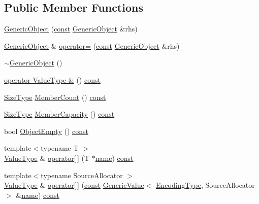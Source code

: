 \subsection*{Public Member Functions}
\begin{DoxyCompactItemize}
\item 
\hyperlink{classGenericObject_a10173c42d0e8a71ca0e3ae75d800887a}{Generic\+Object} (\hyperlink{classGenericObject_af70c9646b5e422306c33e98b3d8783a7}{const} \hyperlink{classGenericObject}{Generic\+Object} \&rhs)
\item 
\hyperlink{classGenericObject}{Generic\+Object} \& \hyperlink{classGenericObject_af8984f76d6f3b13039c6d3b8e217f747}{operator=} (\hyperlink{classGenericObject_af70c9646b5e422306c33e98b3d8783a7}{const} \hyperlink{classGenericObject}{Generic\+Object} \&rhs)
\item 
\hyperlink{classGenericObject_a8ac79abb76ac4d2c647681a37fc4ab46}{$\sim$\+Generic\+Object} ()
\item 
\hyperlink{classGenericObject_a2948af90e01df17989cd844d6197eb18}{operator Value\+Type \&} () \hyperlink{classGenericObject_af70c9646b5e422306c33e98b3d8783a7}{const}
\item 
\hyperlink{rapidjson_8h_a5ed6e6e67250fadbd041127e6386dcb5}{Size\+Type} \hyperlink{classGenericObject_a15326564c82f2b545811f753534563e4}{Member\+Count} () \hyperlink{classGenericObject_af70c9646b5e422306c33e98b3d8783a7}{const}
\item 
\hyperlink{rapidjson_8h_a5ed6e6e67250fadbd041127e6386dcb5}{Size\+Type} \hyperlink{classGenericObject_a0389754cbdb435d732bad6edf4f8cdb2}{Member\+Capacity} () \hyperlink{classGenericObject_af70c9646b5e422306c33e98b3d8783a7}{const}
\item 
bool \hyperlink{classGenericObject_a9cc10bfeeb6a5eb95ba1ae587b6e6ad8}{Object\+Empty} () \hyperlink{classGenericObject_af70c9646b5e422306c33e98b3d8783a7}{const}
\item 
{\footnotesize template$<$typename T $>$ }\\\hyperlink{classGenericObject_a930aa30f89caee7ba7bff60bf9dc21b1}{Value\+Type} \& \hyperlink{classGenericObject_a2d8c758d10e7c7ab23e3904d5936b204}{operator\mbox{[}$\,$\mbox{]}} (T $\ast$\hyperlink{imgui__impl__opengl3__loader_8h_a5c4947d4516dd7cfa3505ce3a648a4ef}{name}) \hyperlink{classGenericObject_af70c9646b5e422306c33e98b3d8783a7}{const}
\item 
{\footnotesize template$<$typename Source\+Allocator $>$ }\\\hyperlink{classGenericObject_a930aa30f89caee7ba7bff60bf9dc21b1}{Value\+Type} \& \hyperlink{classGenericObject_a19bfc1bd98b120d42e7d50db0886614a}{operator\mbox{[}$\,$\mbox{]}} (\hyperlink{classGenericObject_af70c9646b5e422306c33e98b3d8783a7}{const} \hyperlink{classGenericValue}{Generic\+Value}$<$ \hyperlink{classGenericObject_a96ebfdde095e2ce42535d15ae5dc58ef}{Encoding\+Type}, Source\+Allocator $>$ \&\hyperlink{imgui__impl__opengl3__loader_8h_a5c4947d4516dd7cfa3505ce3a648a4ef}{name}) \hyperlink{classGenericObject_af70c9646b5e422306c33e98b3d8783a7}{const}

\end{DoxyCompactItemize}
